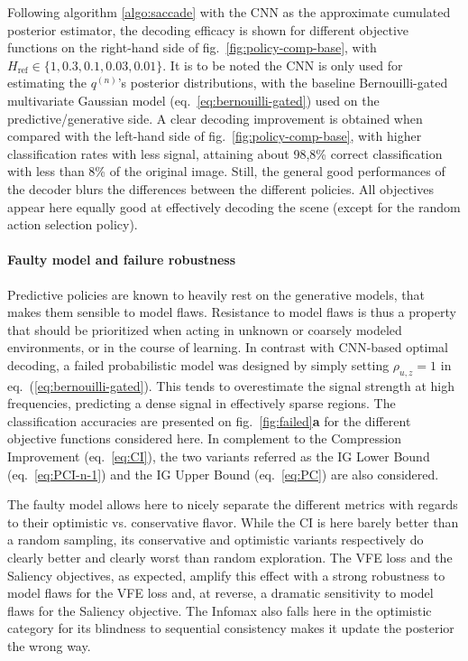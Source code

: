 \documentclass[12pt,twoside,openright]{article}
\begin{document}
Following algorithm \ref{algo:saccade} with the CNN as the {\color{Purple} approximate cumulated posterior estimator}, the decoding efficacy is shown for different objective functions on the right-hand side of  fig.~\ref{fig:policy-comp-base}, with $H_\text{ref} \in \{1, 0.3, 0.1, 0.03, 0.01\}$. {\color{Purple} It is to be noted the CNN is only used for estimating the $q^{(n)}$'s posterior distributions, with the baseline Bernouilli-gated multivariate Gaussian model (eq.~\ref{eq:bernouilli-gated}) used on the predictive/generative side}. A clear decoding improvement is obtained {\color{Purple} when compared with the left-hand side of fig.~\ref{fig:policy-comp-base}}, with higher classification rates with less signal, attaining about 98,8\% correct classification with less than 8\% of the original image. Still, the general good performances of the decoder blurs the differences between the different policies. All objectives appear here equally good at effectively decoding the scene {\color{Purple} (except for the random action selection policy)}. 

\paragraph{Faulty model and failure robustness}
Predictive policies {\color{Purple}are known to heavily rest} on the generative models, that makes them sensible to model flaws. Resistance to model flaws is thus a property that should be prioritized when acting in unknown or coarsely modeled environments, or in the course of learning. In contrast with CNN-based optimal decoding, a failed probabilistic model was designed by simply setting $\rho_{u,z} = 1$ in eq.~(\ref{eq:bernouilli-gated}).  This tends to overestimate the signal strength at high frequencies, predicting a dense signal in effectively sparse regions. The classification accuracies are presented on fig.~\ref{fig:failed}\textbf{a} for the different objective functions considered here. In complement to the Compression Improvement (eq.~\ref{eq:CI}), the two variants referred as the IG Lower Bound (eq.~\ref{eq:PCI-n-1}) and the IG Upper Bound (eq.~\ref{eq:PC}) are also considered. 

The faulty model allows here to nicely separate the different metrics with regards to their optimistic vs. conservative flavor. While the CI is here barely  better than a random sampling, its conservative and optimistic variants respectively do clearly better and clearly worst than random exploration. The VFE loss and the Saliency objectives, as expected, amplify this effect with a strong robustness to model flaws for the VFE loss and, at reverse, a dramatic sensitivity  to model flaws for the Saliency objective. The Infomax also falls here in the optimistic category for its blindness to sequential consistency makes it update the posterior the wrong way.
\end{document}
